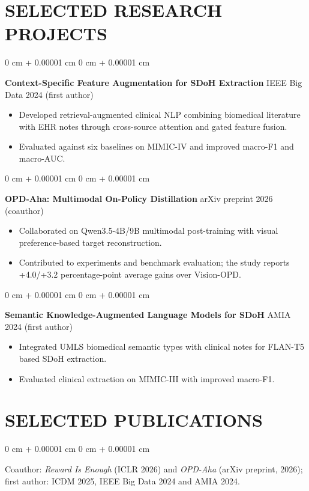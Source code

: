 \documentclass[10pt, letterpaper]{article}
\newenvironment{highlights}{
    \begin{itemize}[
        topsep=0.03 cm,
        parsep=0.03 cm,
        partopsep=0pt,
        itemsep=0pt,
        leftmargin=0 cm + 10pt
    ]
}{
    \end{itemize}
} %
\newenvironment{onecolentry}{
    \begin{adjustwidth}{
        0 cm + 0.00001 cm
    }{
        0 cm + 0.00001 cm
    }
}{
    \end{adjustwidth}
} %
\begin{document}
\section{SELECTED RESEARCH PROJECTS}
\begin{onecolentry}
\textbf{Context-Specific Feature Augmentation for SDoH Extraction} \hfill IEEE Big Data 2024 (first author)
\begin{highlights}
\item Developed retrieval-augmented clinical NLP combining biomedical literature with EHR notes through cross-source attention and gated feature fusion.
\item Evaluated against six baselines on MIMIC-IV and improved macro-F1 and macro-AUC.
\end{highlights}
\end{onecolentry}
\vspace{0.025 cm}
\begin{onecolentry}
\textbf{OPD-Aha: Multimodal On-Policy Distillation} \hfill arXiv preprint 2026 (coauthor)
\begin{highlights}
\item Collaborated on Qwen3.5-4B/9B multimodal post-training with visual preference-based target reconstruction.
\item Contributed to experiments and benchmark evaluation; the study reports +4.0/+3.2 percentage-point average gains over Vision-OPD.
\end{highlights}
\end{onecolentry}
\vspace{0.025 cm}
\begin{onecolentry}
\textbf{Semantic Knowledge-Augmented Language Models for SDoH} \hfill AMIA 2024 (first author)
\begin{highlights}
\item Integrated UMLS biomedical semantic types with clinical notes for FLAN-T5 based SDoH extraction.
\item Evaluated clinical extraction on MIMIC-III with improved macro-F1.
\end{highlights}
\end{onecolentry}
\vspace{0.025 cm}
\section{SELECTED PUBLICATIONS}
\begin{onecolentry}
Coauthor: \textit{Reward Is Enough} (ICLR 2026) and \textit{OPD-Aha} (arXiv preprint, 2026); first author: ICDM 2025, IEEE Big Data 2024 and AMIA 2024.
\end{onecolentry}
\end{document}
